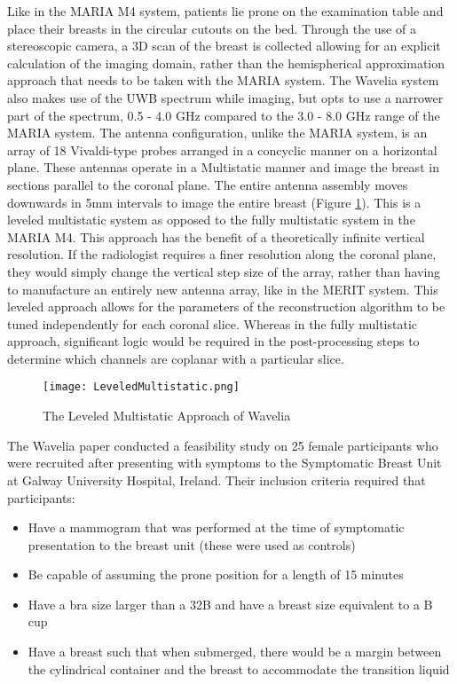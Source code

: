 Like in the MARIA M4 system, patients lie prone on the examination table and place their breasts in the circular cutouts
on the bed. Through the use of a stereoscopic camera, a 3D scan of the breast is collected allowing for an explicit
calculation of the imaging domain, rather than the hemispherical approximation approach that needs to be taken with the
MARIA system. The Wavelia system also makes use of the UWB spectrum while imaging, but opts to use a narrower part of
the spectrum, 0.5 - 4.0 GHz compared to the 3.0 - 8.0 GHz range of the MARIA system. The antenna configuration, unlike
the MARIA system, is an array of 18 Vivaldi-type probes arranged in a concyclic manner on a horizontal plane. These
antennas operate in a Multistatic manner and image the breast in sections parallel to the coronal plane. The entire
antenna assembly moves downwards in 5mm intervals to image the entire breast (Figure
\ref{fig:LeveledMultistaticExample}). This is a leveled multistatic system as opposed to the fully multistatic system in
the MARIA M4. This approach has the benefit of a theoretically infinite vertical resolution. If the radiologist requires
a finer resolution along the coronal plane, they would simply change the vertical step size of the array, rather than
having to manufacture an entirely new antenna array, like in the MERIT system. This leveled approach allows for the
parameters of the reconstruction algorithm to be tuned independently for each coronal slice. Whereas in the fully
multistatic approach, significant logic would be required in the post-processing steps to determine which channels are
coplanar with a particular slice. \hfill \break

\begin{figure}
    \texttt{[image: LeveledMultistatic.png]}
    \centering
    \caption{The Leveled Multistatic Approach of Wavelia \cite{moloneyWaveliaMicrowaveBreast2021}}
    \label{fig:LeveledMultistaticExample}
\end{figure}

\noindent The Wavelia paper \cite{moloneyWaveliaMicrowaveBreast2021} conducted a feasibility study on 25 female
participants who were recruited after presenting with symptoms to the Symptomatic Breast Unit at Galway University
Hospital, Ireland. Their inclusion criteria required that participants:

\begin{itemize}
    \item Have a mammogram that was performed at the time of symptomatic presentation to the breast unit (these were
    used as controls)
    \item Be capable of assuming the prone position for a length of 15 minutes
    \item Have a bra size larger than a 32B and have a breast size equivalent to a B cup
    \item Have a breast such that when submerged, there would be a margin between the cylindrical container and the
    breast to accommodate the transition liquid 
\end{itemize}

